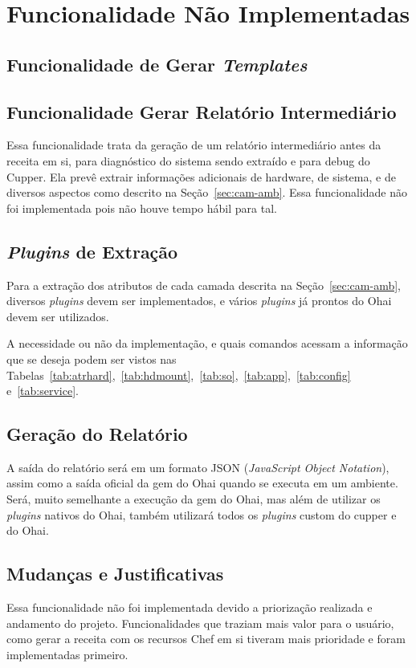 \section{Funcionalidade Não Implementadas}
\label{sec:rel}

\subsection{Funcionalidade de Gerar \textit{Templates}}

\subsection{Funcionalidade Gerar Relatório Intermediário}
Essa funcionalidade trata da geração de um relatório intermediário antes da 
receita em si, para diagnóstico do sistema sendo extraído e para debug do 
Cupper. Ela prevê extrair informações adicionais de hardware, de sistema, e de
diversos aspectos como descrito na Seção~\ref{sec:cam-amb}. Essa funcionalidade
não foi implementada pois não houve tempo hábil para tal.

\subsection{\textit{Plugins} de Extração}
Para a extração dos atributos de cada camada descrita na Seção~\ref{sec:cam-amb},
diversos \textit{plugins} devem ser implementados, e vários \textit{plugins} já prontos do Ohai
devem ser utilizados.

A necessidade ou não da implementação, e quais comandos acessam a informação 
que se deseja podem ser vistos nas Tabelas~\ref{tab:atrhard},~\ref{tab:hdmount},~\ref{tab:so},~\ref{tab:app},~\ref{tab:config} e~\ref{tab:service}.

\subsection{Geração do Relatório}
A saída do relatório será em um formato JSON (\textit{JavaScript Object Notation}),
assim como a saída oficial da gem do Ohai quando se executa em um ambiente. Será,
muito semelhante a execução da gem do Ohai, mas além de utilizar os \textit{plugins} nativos
do Ohai, também utilizará todos os \textit{plugins} custom do cupper e do Ohai.

\subsection{Mudanças e Justificativas}
Essa funcionalidade não foi implementada devido a priorização realizada e andamento
do projeto. Funcionalidades que traziam mais valor para o usuário, como 
gerar a receita com os recursos Chef em si tiveram mais prioridade e foram implementadas
primeiro.
